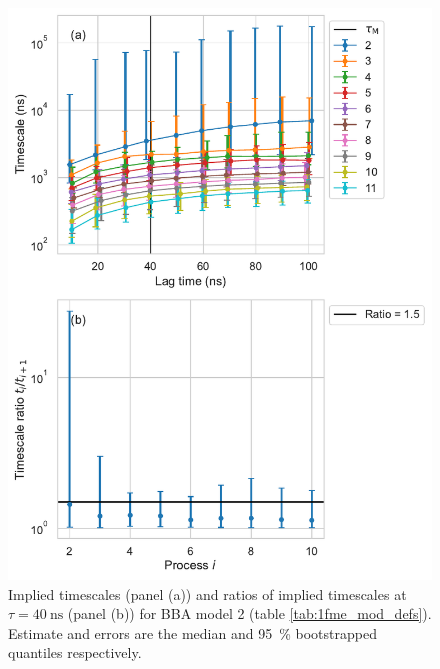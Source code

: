 \documentclass{article}
\begin{document}
\begin{figure}
    \centering
    \includegraphics[height=0.65\textheight]{figures/its/bba/BBA_model_logit(dist.)_method_m1.pdf}
    \caption{Implied timescales (panel (a)) and ratios of implied timescales at $\tau=\SI{40}{\nano\second}$ (panel (b)) for BBA model 2 (table \ref{tab:1fme_mod_defs}). Estimate and errors are the median and \SI{95}{\percent} bootstrapped quantiles respectively.}
    \label{fig:its_bba_2}
\end{figure}
\end{document}
